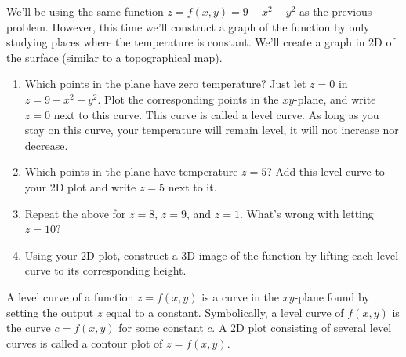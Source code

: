 \begin{problem}\label{cake level curves plot}%
%
%
We'll be using the same function $z=f(x,y)=9-x^2-y^2$ as the previous problem.  However, this time we'll construct a graph of the function by only studying places where the temperature is constant.  We'll create a graph in 2D of the surface (similar to a topographical map). 
 \begin{enumerate}
  \item%
%
Which points in the plane have zero temperature? Just let $z=0$ in $z=9-x^2-y^2$. Plot the corresponding points in the $xy$-plane, and write $z=0$ next to this curve. This curve is called a level curve. As long as you stay on this curve, your temperature will remain level, it will not increase nor decrease. 
  \item Which points in the plane have temperature $z=5$?  Add this level curve to your 2D plot and write $z=5$ next to it.
  \item Repeat the above for $z=8$, $z=9$, and $z=1$. What's wrong with letting $z=10$? 
  \item Using your 2D plot, construct a 3D image of the function by lifting each level curve to its corresponding height.
 \end{enumerate}
\end{problem}

\begin{definition}
 A level curve of a function $z=f(x,y)$ is a curve in the $xy$-plane found by setting the output $z$ equal to a constant. Symbolically, a level curve of $f(x,y)$ is the curve $c=f(x,y)$ for some constant $c$.  A 2D plot consisting of several level curves is called a contour plot of $z=f(x,y)$.
\end{definition}

